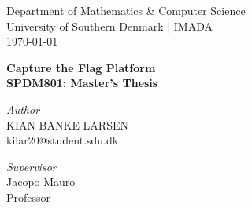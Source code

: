 

\usepackage[block=ragged, sorting=nyt, backend=biber]{biblatex}
\setlength{}



\begin{titlepage}
    \begin{centering}
    \vspace*{-20px}\large Department of Mathematics \& Computer Science\\
    University of Southern Denmark $|$ IMADA \\
    \today \\
    
    \vspace{\fill}
    
    \huge{\bf  Capture the Flag Platform} \\
    \Large{\bf SPDM801: Master's Thesis}
    
    \vspace{\fill}
    
    \begin{minipage}{0.45\textwidth} 
    \begin{flushleft}
        \Large
        \textit{Author}\\
        KIAN BANKE LARSEN\\
        kilar20@student.sdu.dk
    \end{flushleft}
    \end{minipage}
    
    \vspace{\fill}
    
    \begin{minipage}{0.45\textwidth}
    \begin{flushleft}
        \Large
        \textit{Supervisor}\\
        Jacopo Mauro\\
        Professor
    \end{flushleft}
    \end{minipage}
    
    \vspace{\fill}
    
    
    
    \vspace*{0.1cm}
    
    \end{centering}
    
    \thispagestyle{empty}
\end{titlepage}

